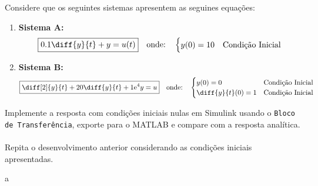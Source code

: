 \documentclass{article}
\begin{document}
            \begin{exercise}
                Considere que os seguintes sistemas apresentem as seguines equações:
                    \begin{enumerate}
                        \item \textbf{Sistema A:}
                            \begin{equation}
                                \boxed{
                                    0.1\diff{y}{t} + y = u(t)
                                }
                                \quad
                                \text{onde:}
                                \quad
                                \begin{cases}
                                    y(0) = 10 & \text{Condição Inicial}\\
                                \end{cases}
                            \end{equation}
                        \item \textbf{Sistema B:}
                            \begin{equation}
                                \boxed{
                                    \diff[2]{y}{t} + 
                                    20\diff{y}{t} + 
                                    1\text{e}^{4} y = u
                                }
                                \quad
                                \text{onde:}
                                \quad
                                \begin{cases}
                                    y(0) = 0           & \text{Condição Inicial}\\
                                    \diff{y}{t}(0) = 1 & \text{Condição Inicial}\\
                                \end{cases}
                            \end{equation}
                    \end{enumerate}
                Implemente a resposta com condições iniciais nulas em Simulink usando o \texttt{Bloco de Transferência}, exporte para o MATLAB e compare com a resposta analítica.
                \\\\
                Repita o desenvolvimento anterior considerando as condições iniciais apresentadas.
            \end{exercise}
            \begin{resolution}
                a
            \end{resolution}
\end{document}
